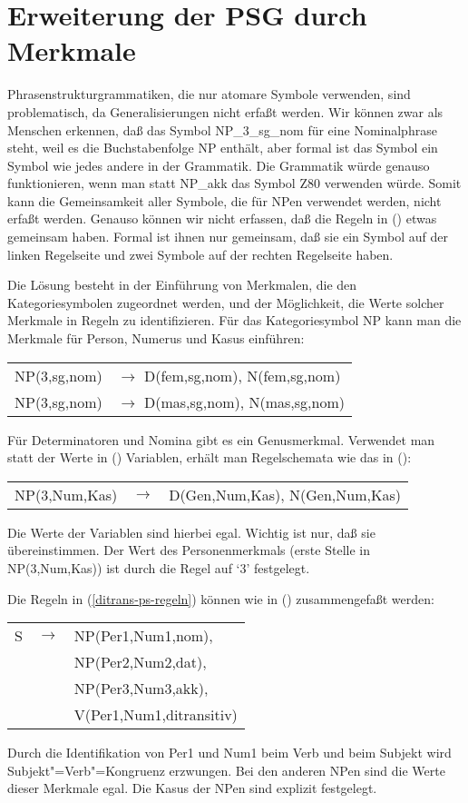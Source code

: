 \section{Erweiterung der PSG durch Merkmale}


Phrasenstrukturgrammatiken, die nur atomare Symbole verwenden, sind problematisch,
da Generalisierungen nicht erfaßt werden. Wir können zwar als Menschen erkennen, daß
das Symbol NP\_3\_sg\_nom für eine Nominalphrase steht, weil es die Buchstabenfolge NP
enthält, aber formal ist das Symbol ein Symbol wie jedes andere in der Grammatik. Die Grammatik
würde genauso funktionieren, wenn man statt NP\_akk das Symbol Z80 verwenden würde. Somit kann die
Gemeinsamkeit aller Symbole, die für NPen verwendet werden, nicht erfaßt werden. 
Genauso können wir nicht erfassen, daß die Regeln in () etwas gemeinsam haben.
Formal ist ihnen nur gemeinsam, daß sie ein Symbol auf der linken Regelseite und 
zwei Symbole auf der rechten Regelseite haben.

Die Lösung besteht in der Einführung von Merkmalen, die den Kategoriesymbolen
zugeordnet werden, und der Möglichkeit, die Werte solcher Merkmale in Regeln zu identifizieren.
Für das Kategoriesymbol NP kann man \zb die Merkmale für Person, Numerus und Kasus einführen:
\ea
\begin{tabular}[t]{@{}l@{ }l}
NP(3,sg,nom)  & $\to$ D(fem,sg,nom), N(fem,sg,nom)\\
NP(3,sg,nom)  & $\to$ D(mas,sg,nom), N(mas,sg,nom)\\
\end{tabular}
\z
Für Determinatoren und Nomina gibt es ein Genusmerkmal. Verwendet man statt der
Werte in () Variablen, erhält man Regelschemata wie das in ():
\ea
\begin{tabular}[t]{@{}l@{ }l@{ }l}
NP({3},{Num},{Kas}) & $\to$ & D(Gen,{Num},{Kas}), N(Gen,{Num},{Kas})\\
\end{tabular}
\z
Die Werte der Variablen sind hierbei egal. Wichtig ist nur, daß sie übereinstimmen.
Der Wert des Personenmerkmals (erste Stelle in NP(3,Num,Kas)) ist durch die Regel auf `3' festgelegt.

Die Regeln in (\ref{ditrans-ps-regeln}) können wie in () zusammengefaßt werden:
\ea
\begin{tabular}[t]{@{}l@{ }l@{ }l}
S  & $\to$ & NP({Per1},{Num1},{nom}), \\
   &       & NP(Per2,Num2,{dat}),\\
   &       & NP(Per3,Num3,{akk}),\\
   &       & V({Per1},{Num1},ditransitiv)\\
\end{tabular}
\z
Durch die Identifikation von Per1 und Num1 beim Verb und beim Subjekt wird Subjekt"=Verb"=Kongruenz erzwungen.
Bei den anderen NPen sind die Werte dieser Merkmale egal. Die Kasus der NPen sind explizit festgelegt.

